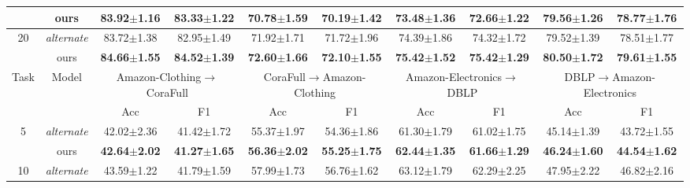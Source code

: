 \begin{table*}[ht]
{\begin{tabular}{@{}c|c|cccccccc@{}}
                      & ours                   & \textbf{83.92$\pm$1.16}          & \textbf{83.33$\pm$1.22}         & \textbf{70.78$\pm$1.59}          & \textbf{70.19$\pm$1.42}         & \textbf{73.48$\pm$1.36}         & \textbf{72.66$\pm$1.22}         & \textbf{79.56$\pm$1.26}         & \textbf{78.77$\pm$1.76}         \\ \midrule
\multirow{2}{*}{20}   & \textit{alternate}                 & 83.72$\pm$1.38                   & 82.95$\pm$1.49                  & 71.92$\pm$1.71                   & 71.72$\pm$1.96                  & 74.39$\pm$1.86                  & 74.32$\pm$1.72                  & 79.52$\pm$1.39                  & 78.51$\pm$1.77                  \\
                      & ours                   & \textbf{84.66$\pm$1.55}          & \textbf{84.52$\pm$1.39}         & \textbf{72.60$\pm$1.66}          & \textbf{72.10$\pm$1.55}         & \textbf{75.42$\pm$1.52}         & \textbf{75.42$\pm$1.29}         & \textbf{80.50$\pm$1.72}         & \textbf{79.61$\pm$1.55}         \\ \midrule
\multirow{2}{*}{Task} & \multirow{2}{*}{Model} & \multicolumn{2}{c}{Amazon-Clothing$\rightarrow$CoraFull} & \multicolumn{2}{c}{CoraFull$\rightarrow$Amazon-Clothing} & \multicolumn{2}{c}{Amazon-Electronics$\rightarrow$DBLP} & \multicolumn{2}{c}{DBLP$\rightarrow$Amazon-Electronics} \\ \cmidrule(l){3-10} 
                      &                        & Acc                          & F1                          & Acc                          & F1                          & Acc                         & F1                          & Acc                         & F1                          \\ \midrule
\multirow{2}{*}{5}    & \textit{alternate}                 & 42.02$\pm$2.36                   & 41.42$\pm$1.72                  & 55.37$\pm$1.97                   & 54.36$\pm$1.86                  & 61.30$\pm$1.79                  & 61.02$\pm$1.75                  & 45.14$\pm$1.39                  & 43.72$\pm$1.55                  \\
                      & ours                   & \textbf{42.64$\pm$2.02}          & \textbf{41.27$\pm$1.65}         & \textbf{56.36$\pm$2.02}          & \textbf{55.25$\pm$1.75}         & \textbf{62.44$\pm$1.35}         & \textbf{61.66$\pm$1.29}         & \textbf{46.24$\pm$1.60}         & \textbf{44.54$\pm$1.62}         \\ \midrule
\multirow{2}{*}{10}   & \textit{alternate}                 & 43.59$\pm$1.22                   & 41.79$\pm$1.59                  & 57.99$\pm$1.73                   & 56.76$\pm$1.62                  & 63.12$\pm$1.79                  & 62.29$\pm$2.25                  & 47.95$\pm$2.22                  & 46.82$\pm$2.16                  \\

\end{tabular}}
\end{table*}
